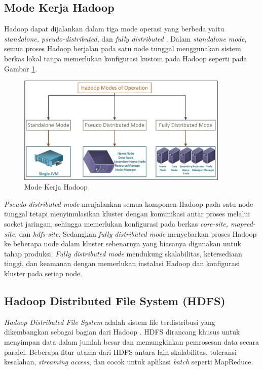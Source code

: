 \subsection{Mode Kerja Hadoop}
Hadoop dapat dijalankan dalam tiga mode operasi yang berbeda yaitu \textit{standalone, pseudo-distributed}, dan \textit{fully distributed} \cite{johnDataLakeEnterprises2017}. Dalam \textit{standalone mode}, semua proses Hadoop berjalan pada satu node tunggal menggunakan sistem berkas lokal tanpa memerlukan konfigurasi kustom pada Hadoop seperti pada Gambar \ref{fig:hadoop-modes}. 

\begin{figure}[h!]
    \centering
    \includegraphics[width=0.9\textwidth]{figures/ch02/hadoop-modes}
    \caption{Mode Kerja Hadoop \cite{khataiImplementationTextMining2021}}
    \label{fig:hadoop-modes}
\end{figure}

\textit{Pseudo-distributed mode} menjalankan semua komponen Hadoop pada satu node tunggal tetapi menyimulasikan kluster dengan komunikasi antar proses melalui socket jaringan, sehingga memerlukan konfigurasi pada berkas \textit{core-site, mapred-site}, dan \textit{hdfs-site}. Sedangkan \textit{fully distributed mode} menyebarkan proses Hadoop ke beberapa node dalam kluster sebenarnya yang biasanya digunakan untuk tahap produksi. \textit{Fully distributed mode} mendukung skalabilitas, ketersediaan tinggi, dan keamanan dengan memerlukan instalasi Hadoop dan konfigurasi kluster pada setiap node.

\subsection{Hadoop Distributed File System (HDFS)}
\textit{Hadoop Distributed File System} adalah sistem file terdistribusi yang dikembangkan sebagai bagian dari Hadoop \cite{abhishekIntegratedHadoopCloud2017}. HDFS dirancang khusus untuk menyimpan data dalam jumlah besar dan memungkinkan pemrosesan data secara paralel. Beberapa fitur utama dari HDFS antara lain skalabilitas, toleransi kesalahan, \textit{streaming access}, dan cocok untuk aplikasi \textit{batch} seperti MapReduce.

